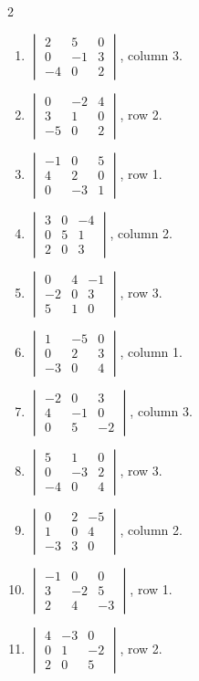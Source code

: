 \begin{multicols}{2}
\begin{enumerate}[label=\arabic*.,  leftmargin=*]
\item $\begin{vmatrix}2&5&0\\0&-1&3\\-4&0&2\end{vmatrix}$, \quad column 3.
\item $\begin{vmatrix}0&-2&4\\3&1&0\\-5&0&2\end{vmatrix}$, \quad row 2.
\item $\begin{vmatrix}-1&0&5\\4&2&0\\0&-3&1\end{vmatrix}$, \quad row 1.
\item $\begin{vmatrix}3&0&-4\\0&5&1\\2&0&3\end{vmatrix}$, \quad column 2.
\item $\begin{vmatrix}0&4&-1\\-2&0&3\\5&1&0\end{vmatrix}$, \quad row 3.
\item $\begin{vmatrix}1&-5&0\\0&2&3\\-3&0&4\end{vmatrix}$, \quad column 1.
\item $\begin{vmatrix}-2&0&3\\4&-1&0\\0&5&-2\end{vmatrix}$, \quad column 3.
\item $\begin{vmatrix}5&1&0\\0&-3&2\\-4&0&4\end{vmatrix}$, \quad row 3.
\item $\begin{vmatrix}0&2&-5\\1&0&4\\-3&3&0\end{vmatrix}$, \quad column 2.
\item $\begin{vmatrix}-1&0&0\\3&-2&5\\2&4&-3\end{vmatrix}$, \quad row 1.
\item $\begin{vmatrix}4&-3&0\\0&1&-2\\2&0&5\end{vmatrix}$, \quad row 2.
\end{enumerate}
\end{multicols}
